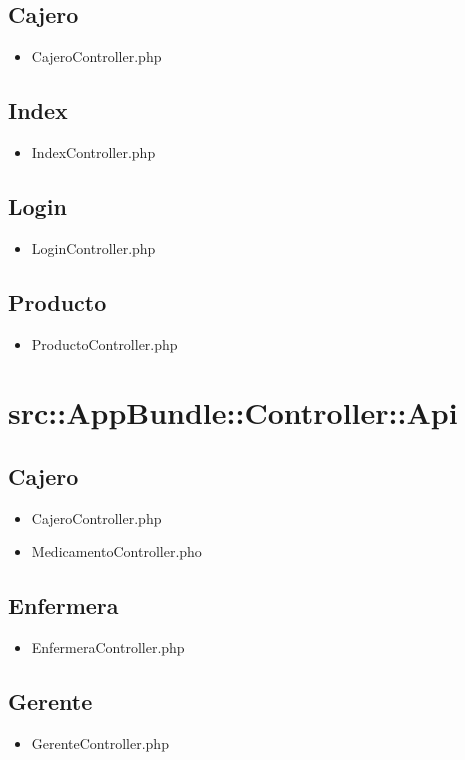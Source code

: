 	\subsection{Cajero}
	\begin{itemize}
		\item CajeroController.php
	\end{itemize}
	\subsection{Index}
	\begin{itemize}
		\item IndexController.php
	\end{itemize}
	\subsection{Login}
	\begin{itemize}
		\item LoginController.php
	\end{itemize}
	\subsection{Producto}
	\begin{itemize}
		\item ProductoController.php
	\end{itemize}
	
	
	\section{src::AppBundle::Controller::Api}
		\subsection{Cajero}
		\begin{itemize}
		\item CajeroController.php
		\item MedicamentoController.pho
		\end{itemize}
		\subsection{Enfermera}
		\begin{itemize}
		\item EnfermeraController.php
		\end{itemize}
		\subsection{Gerente}
		\begin{itemize}
		\item GerenteController.php
		\end{itemize}
